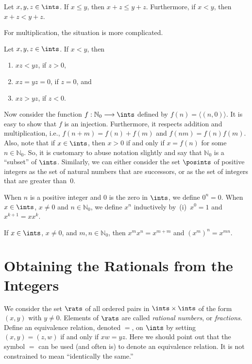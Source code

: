 \begin{theorem} 
Let $x,y,z\in \ints$.  If $x\le y$, then
$x+z\le y+z$.  Furthermore, if $x<y$, then $x+z<y+z$.
\end{theorem}

For multiplication, the situation is more complicated.

\begin{theorem}  
Let $x,y,z\in \ints$.  If
$x<y$, then
\begin{enumerate}
\item $xz<yz$, if $z>0$, 
\item $xz=yz=0$, if $z=0$, and
\item $xz>yz$, if $z<0$.
\end{enumerate}
\end{theorem}

Now consider the function $f:\mathbb{N}_0\longrightarrow \ints$ defined
by $f(n) = \langle(n,0)\rangle$.  It is easy to show that
$f$ is an injection.  Furthermore, it respects addition
and multiplication, i.e., $f(n+m)=f(n)+f(m)$ and
$f(nm)=f(n)f(m)$.   Also, note that if $x\in \ints$, then
$x>0$ if and only if $x=f(n)$ for some $n\in \mathbb{N}_0$. So, it is 
customary to abuse notation slightly and say that $\mathbb{N}_0$ is a 
``subset'' of $\ints$.  Similarly, we can either consider the set
$\posints$ of positive integers as the set of natural numbers that are
successors, or as the set of integers
that are greater than~$0$.

When $n$ is a positive integer and $0$ is the zero in $\ints$, we
define $0^n=0$.  When $x\in\ints$, $x\neq 0$ and $n\in\mathbb{N}_0$,
we define $x^n$ inductively by~(i)~$x^0=1$ and $x^{k+1}=xx^k$.

\begin{theorem}
If $x\in\ints$, $x\neq0$, and $m,n\in\mathbb{N}_0$, then
$x^mx^n=x^{m+m}$ and $(x^m)^n=x^{mn}$.
\end{theorem}

\section{Obtaining the Rationals from the Integers}\label{s:rationals}

We consider the set $\rats$ of all ordered pairs in $\ints\times \ints$ of
the form $(x,y)$ with $y\neq 0$. Elements of $\rats$ are called
\textit{rational numbers}, or \textit{fractions}.  Define
an equivalence relation, denoted $=$, on $\ints$ by
setting $(x,y)=(z,w)$ if and only if $xw=yz$.  Here we
should point out that the symbol $=$ can be used (and often is)
to denote an equivalence relation. It is not constrained to mean ``identically
the same.''
  
